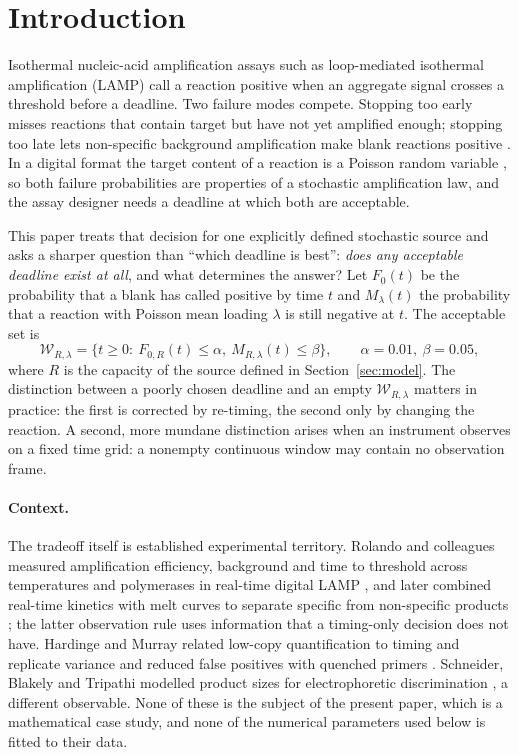 \documentclass[11pt,a4paper]{article}
\theoremstyle{plain}
\theoremstyle{definition}
\theoremstyle{remark}
\newcommand{\Wc}{\mathcal W}
\begin{document}
\section{Introduction}\label{sec:intro}

Isothermal nucleic-acid amplification assays such as loop-mediated isothermal amplification (LAMP) \citep{notomi2000} call a reaction positive when an aggregate signal crosses a threshold before a deadline. Two failure modes compete. Stopping too early misses reactions that contain target but have not yet amplified enough; stopping too late lets non-specific background amplification make blank reactions positive \citep{rolando2019,hardinge2019}. In a digital format the target content of a reaction is a Poisson random variable \citep{vogelstein1999}, so both failure probabilities are properties of a stochastic amplification law, and the assay designer needs a deadline at which both are acceptable.

This paper treats that decision for one explicitly defined stochastic source and asks a sharper question than ``which deadline is best'': \emph{does any acceptable deadline exist at all}, and what determines the answer? Let $F_0(t)$ be the probability that a blank has called positive by time $t$ and $M_\lambda(t)$ the probability that a reaction with Poisson mean loading $\lambda$ is still negative at $t$. The acceptable set is
\begin{equation}\label{eq:window}
\Wc_{R,\lambda}=\{t\ge0:\ F_{0,R}(t)\le\alpha,\ M_{R,\lambda}(t)\le\beta\},\qquad \alpha=0.01,\ \beta=0.05,
\end{equation}
where $R$ is the capacity of the source defined in Section~\ref{sec:model}. The distinction between a poorly chosen deadline and an empty $\Wc_{R,\lambda}$ matters in practice: the first is corrected by re-timing, the second only by changing the reaction. A second, more mundane distinction arises when an instrument observes on a fixed time grid: a nonempty continuous window may contain no observation frame.

\paragraph{Context.} The tradeoff itself is established experimental territory. Rolando and colleagues measured amplification efficiency, background and time to threshold across temperatures and polymerases in real-time digital LAMP \citep{rolando2019}, and later combined real-time kinetics with melt curves to separate specific from non-specific products \citep{rolando2020}; the latter observation rule uses information that a timing-only decision does not have. Hardinge and Murray related low-copy quantification to timing and replicate variance \citep{hardinge2020} and reduced false positives with quenched primers \citep{hardinge2019}. Schneider, Blakely and Tripathi modelled product sizes for electrophoretic discrimination \citep{schneider2019}, a different observable. None of these is the subject of the present paper, which is a mathematical case study, and none of the numerical parameters used below is fitted to their data.
\end{document}
